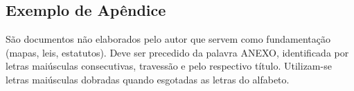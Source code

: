 \begin{anexosenv}

\chapter{Exemplo de Apêndice}
\label{Anex:Anex1}
São documentos não elaborados pelo autor que servem como fundamentação (mapas, leis, estatutos). Deve ser precedido da palavra ANEXO, identificada por letras maiúsculas consecutivas, travessão e pelo respectivo título. Utilizam-se letras maiúsculas dobradas quando esgotadas as letras do alfabeto.

\end{anexosenv}